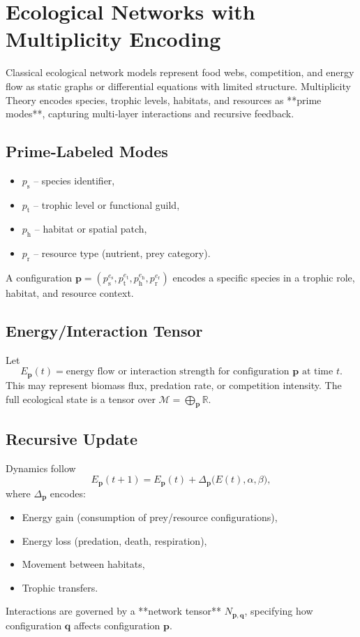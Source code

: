 \documentclass[11pt]{article}
\begin{document}
\section{Ecological Networks with Multiplicity Encoding}
\label{sec:eco}

Classical ecological network models represent food webs, competition, and energy flow as static graphs or differential equations with limited structure. Multiplicity Theory encodes species, trophic levels, habitats, and resources as **prime modes**, capturing multi‑layer interactions and recursive feedback.

\subsection{Prime‑Labeled Modes}
\begin{itemize}
    \item \(p_{\text{s}}\) – species identifier,
    \item \(p_{\text{t}}\) – trophic level or functional guild,
    \item \(p_{\text{h}}\) – habitat or spatial patch,
    \item \(p_{\text{r}}\) – resource type (nutrient, prey category).
\end{itemize}
A configuration \(\mathbf{p} = (p_{\text{s}}^{e_{\text{s}}}, p_{\text{t}}^{e_{\text{t}}}, p_{\text{h}}^{e_{\text{h}}}, p_{\text{r}}^{e_{\text{r}}})\) encodes a specific species in a trophic role, habitat, and resource context.

\subsection{Energy/Interaction Tensor}
Let
\[
E_{\mathbf{p}}(t) = \text{energy flow or interaction strength for configuration } \mathbf{p} \text{ at time } t.
\]
This may represent biomass flux, predation rate, or competition intensity. The full ecological state is a tensor over \(\mathcal{M} = \bigoplus_{\mathbf{p}} \mathbb{R}\).

\subsection{Recursive Update}
Dynamics follow
\[
E_{\mathbf{p}}(t+1) = E_{\mathbf{p}}(t) + \Delta_{\mathbf{p}}\big(E(t), \alpha, \beta\big),
\]
where \(\Delta_{\mathbf{p}}\) encodes:
\begin{itemize}
    \item Energy gain (consumption of prey/resource configurations),
    \item Energy loss (predation, death, respiration),
    \item Movement between habitats,
    \item Trophic transfers.
\end{itemize}
Interactions are governed by a **network tensor** \(N_{\mathbf{p},\mathbf{q}}\), specifying how configuration \(\mathbf{q}\) affects configuration \(\mathbf{p}\).
\end{document}
